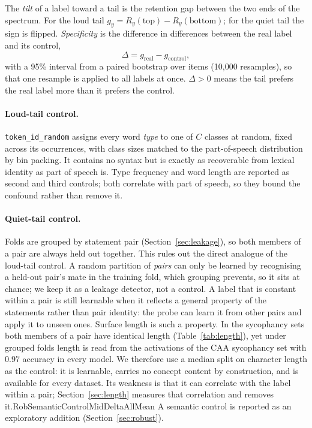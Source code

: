 \documentclass[11pt]{report}
\newcommand{\ifsemantic}[1]{\ifcsname RobSemanticControlMidDeltaAllMean\endcsname #1\fi}
\begin{document}
The \emph{tilt} of a label toward a tail is the retention gap between the two
ends of the spectrum. For the loud tail
$g_y = R_y(\text{top}) - R_y(\text{bottom})$; for the quiet tail the sign is
flipped. \emph{Specificity} is the difference in differences between the real
label and its control,
\begin{equation}
  \Delta = g_{\text{real}} - g_{\text{control}},
\end{equation}
with a 95\% interval from a paired bootstrap over items (10{,}000 resamples), so
that one resample is applied to all labels at once. $\Delta > 0$ means the tail
prefers the real label more than it prefers the control.

\paragraph{Loud-tail control.} \texttt{token\_id\_random} assigns every word
\emph{type} to one of $C$ classes at random, fixed across its occurrences, with
class sizes matched to the part-of-speech distribution by bin packing. It
contains no syntax but is exactly as recoverable from lexical identity as part
of speech is. Type frequency and word length are reported as second and third
controls; both correlate with part of speech, so they bound the confound rather
than remove it.

\paragraph{Quiet-tail control.} Folds are grouped by statement pair
(Section~\ref{sec:leakage}), so both members of a pair are always held out
together. This rules out the direct analogue of the loud-tail control. A random
partition of \emph{pairs} can only be learned by recognising a held-out pair's
mate in the training fold, which grouping prevents, so it sits at chance; we
keep it as a leakage detector, not a control. A label that is constant within a
pair is still learnable when it reflects a general property of the statements
rather than pair identity: the probe can learn it from other pairs and apply it
to unseen ones. Surface length is such a property. In the sycophancy sets both
members of a pair have identical length (Table~\ref{tab:length}), yet under grouped folds length is
read from the activations of the CAA sycophancy set with $0.97$ accuracy in
every model. We
therefore use a median split on character length as the control: it is learnable,
carries no concept content by construction, and is available for every dataset.
Its weakness is that it can correlate with the label within a pair;
Section~\ref{sec:length} measures that correlation and removes it.\ifsemantic{ A
semantic control is reported as an exploratory addition
(Section~\ref{sec:robust}).}
\end{document}
